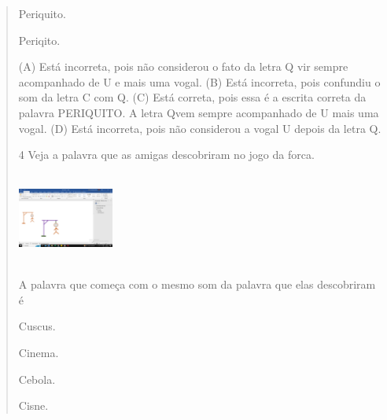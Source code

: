 \begin{verse}
\begin{minipage}{.5\textwidth}
\begin{escolha}
\item Periquito.

\item Periqito.
\end{escolha}
\end{minipage}

(A) Está incorreta, pois não considerou o fato da letra Q vir sempre
acompanhado de U e mais uma vogal.
(B) Está incorreta, pois confundiu o som da letra C com Q.
(C) Está correta, pois essa é a escrita correta da palavra PERIQUITO. A
letra Qvem sempre acompanhado de U mais uma vogal.
(D) Está incorreta, pois não considerou a vogal U depois da letra Q.

\num{4} Veja a palavra que as amigas descobriram no jogo da forca.

\includegraphics[width=1.24236in,height=1.17500in]{media/image166.png}

A palavra que começa com o mesmo som da palavra que elas descobriram é

\begin{minipage}{.5\textwidth}
\begin{escolha}
\item Cuscus.

\item Cinema.

\item Cebola.

\item Cisne.
\end{escolha}
\end{minipage}


\end{verse}

